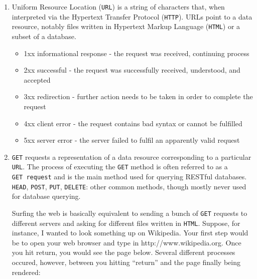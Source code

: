 \documentclass[
  letterpaper,
  DIV=11,
  numbers=noendperiod]{scrreprt}
\providecommand{\tightlist}{%
  \setlength{\itemsep}{0pt}\setlength{\parskip}{0pt}}\usepackage{longtable,booktabs,array}
\begin{document}
\begin{enumerate}
\def\labelenumi{\arabic{enumi}.}
\item
  Uniform Resource Location (\texttt{URL}) is a string of characters
  that, when interpreted via the Hypertext Transfer Protocol
  (\texttt{HTTP}). URLs point to a data resource, notably files written
  in Hypertext Markup Language (\texttt{HTML}) or a subset of a
  database.

  \begin{itemize}
  \tightlist
  \item
    1xx informational response - the request was received, continuing
    process
  \item
    2xx successful - the request was successfully received, understood,
    and accepted
  \item
    3xx redirection - further action needs to be taken in order to
    complete the request
  \item
    4xx client error - the request contains bad syntax or cannot be
    fulfilled
  \item
    5xx server error - the server failed to fulfil an apparently valid
    request
  \end{itemize}
\item
  \texttt{GET} requests a representation of a data resource
  corresponding to a particular \texttt{URL}. The process of executing
  the \texttt{GET} method is often referred to as a
  \texttt{GET\ request} and is the main method used for querying RESTful
  databases. \texttt{HEAD}, \texttt{POST}, \texttt{PUT},
  \texttt{DELETE}: other common methods, though mostly never used for
  database querying.

  Surfing the web is basically equivalent to sending a bunch of
  \texttt{GET} requests to different servers and asking for different
  files written in \texttt{HTML}. Suppose, for instance, I wanted to
  look something up on Wikipedia. Your first step would be to open your
  web browser and type in http://www.wikipedia.org. Once you hit return,
  you would see the page below. Several different processes occured,
  however, between you hitting ``return'' and the page finally being
  rendered:


\end{enumerate}
\end{document}
